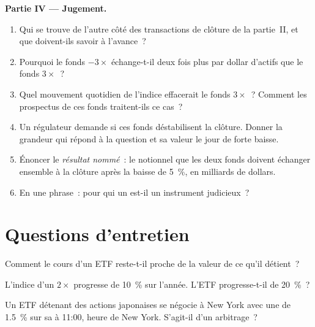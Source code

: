 \begin{problem}
\medskip\noindent\textbf{Partie IV --- Jugement.}
\begin{enumerate}[resume]
\item Qui se trouve de l'autre côté des transactions de clôture de la partie~II, et
que doivent-ils savoir à l'avance~?
\item Pourquoi le fonds $-3\times$ échange-t-il deux fois plus par dollar d'actifs
que le fonds $3\times$~?
\item Quel mouvement quotidien de l'indice effacerait le fonds $3\times$~? Comment les
prospectus de ces fonds traitent-ils ce cas~?
\item Un régulateur demande si ces fonds déstabilisent la clôture. Donner la grandeur qui
répond à la question et sa valeur le jour de forte baisse.
\item Énoncer le \emph{résultat nommé}~: le notionnel que les deux fonds doivent échanger
ensemble à la clôture après la baisse de 5~\%, en milliards de dollars.
\item En une phrase~: pour qui un  est-il un instrument judicieux~?
\end{enumerate}
\end{problem}

\section{Questions d'entretien}

\begin{interviewq}\label{iq:m1:exchange-traded-funds:1}
Comment le cours d'un ETF reste-t-il proche de la valeur de ce qu'il détient~?
\end{interviewq}

\begin{interviewq}\label{iq:m1:exchange-traded-funds:2}
L'indice d'un  $2\times$ progresse de 10~\% sur l'année. L'ETF progresse-t-il
de 20~\%~?
\end{interviewq}

\begin{interviewq}\label{iq:m1:exchange-traded-funds:3}
Un ETF détenant des actions japonaises se négocie à New York avec une  de 1.5~\% sur sa
 à 11:00, heure de New York. S'agit-il d'un arbitrage~?
\end{interviewq}

